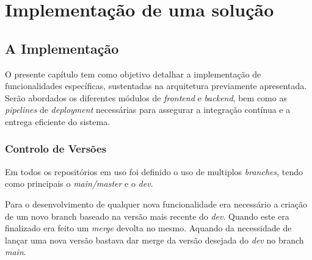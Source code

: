\chapter{Implementação de uma solução}

\section{A Implementação}

O presente capítulo tem como objetivo detalhar a implementação de funcionalidades específicas, sustentadas na arquitetura previamente apresentada. Serão abordados os diferentes módulos de \textit{frontend} e \textit{backend}, bem como as \textit{pipelines} de \textit{deployment} necessárias para assegurar a integração contínua e a entrega eficiente do sistema.





\subsection{Controlo de Versões}

Em todos os repositórios em uso foi definido o uso de multiplos \textit{branches}, tendo como principais o \textit{main/master} e o \textit{dev}. 

Para o desenvolvimento de qualquer nova funcionalidade era necessário a criação de um novo branch baseado na versão mais recente do \textit{dev}. Quando este era finalizado era feito um \textit{merge} devolta no mesmo. Aquando da necessidade de lançar uma nova versão bastava dar merge da versão desejada do \textit{dev} no branch \textit{main}.







